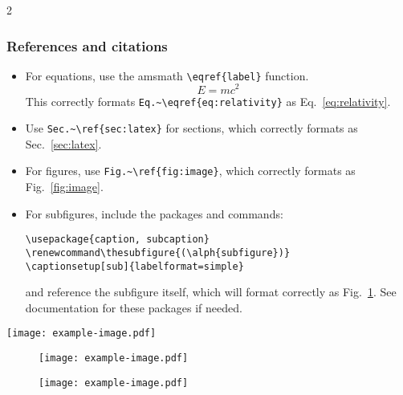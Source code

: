 \documentclass[10pt, letter]{article}
\renewcommand\thesubfigure{(\alph{subfigure})}
\begin{document}
\begin{multicols}{2}
\subsubsection*{References and citations}

\begin{itemize}
\item For equations, use the amsmath \verb|\eqref{label}| function.
  \begin{equation}\label{eq:relativity}
    E = mc^2
  \end{equation}
  This correctly formats \verb|Eq.~\eqref{eq:relativity}| as
  Eq.~\eqref{eq:relativity}.
\item Use \verb|Sec.~\ref{sec:latex}| for sections, which correctly
  formats as Sec.~\ref{sec:latex}.
\item For figures, use \verb|Fig.~\ref{fig:image}|, which correctly
  formats as Fig.~\ref{fig:image}.
\item For subfigures, include the packages and commands:
\begin{lstlisting}
\usepackage{caption, subcaption}
\renewcommand\thesubfigure{(\alph{subfigure})}
\captionsetup[sub]{labelformat=simple}
\end{lstlisting}
and reference the subfigure itself,
which will format correctly as Fig.~\ref{fig:multifig_a}. See
documentation for these packages if needed.
\end{itemize}

\begin{figure*}[b]
  \centering
  \texttt{[image: example-image.pdf]}
  \caption{Single figure}
  \label{fig:image}
\end{figure*}

\begin{figure*}
  \centering
  \begin{subfigure}[b]{0.4\textwidth}
    \texttt{[image: example-image.pdf]}
    \caption{}\label{fig:multifig_a}
  \end{subfigure}\hfill
    \begin{subfigure}[b]{0.4\textwidth}
    \texttt{[image: example-image.pdf]}
    \caption{}\label{fig:multifig_b}
  \end{subfigure}\hfill
  \caption{Subfigure with parts (a) and (b).}
  \label{fig:multifig}
\end{figure*}



\end{multicols}
\end{document}
